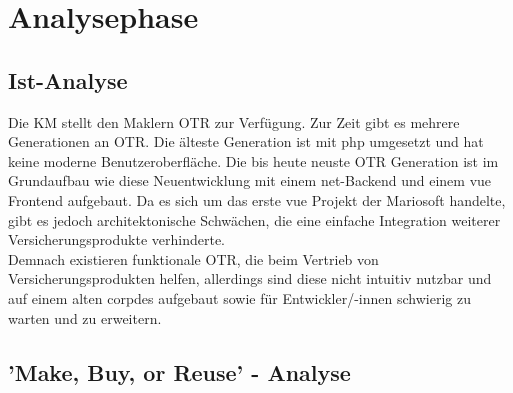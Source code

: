 \section{Analysephase}
\label{analysephase}

\subsection{Ist-Analyse}
\label{ist}
\begin{comment}
evtl alte otrs mit nutzwertanalyse vergleichen?
\end{comment}
Die \ac{KM} stellt den Maklern \ac{OTR} zur Verfügung. Zur Zeit gibt es mehrere Generationen an \ac{OTR}. Die älteste Generation ist mit \gls{php} umgesetzt und hat keine moderne Benutzeroberfläche. Die bis heute neuste \ac{OTR} Generation ist im Grundaufbau wie diese Neuentwicklung mit einem \gls{net}-Backend und einem \gls{vue} Frontend aufgebaut. Da es sich um das erste \gls{vue} Projekt der Mariosoft handelte, gibt es jedoch architektonische Schwächen, die eine einfache Integration weiterer Versicherungsprodukte verhinderte. \\
Demnach existieren funktionale \ac{OTR}, die beim Vertrieb von Versicherungsprodukten helfen, allerdings sind diese nicht intuitiv nutzbar und auf einem alten \gls{corpdes} aufgebaut sowie für Entwickler/-innen schwierig zu warten und zu erweitern.

\subsection{'Make, Buy, or Reuse' - Analyse}
\label{makeOrBuy}

